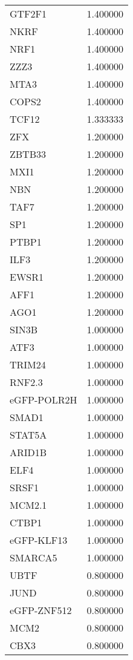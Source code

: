 \begin{longtable}{lr}
          GTF2F1 &  1.400000 \\
            NKRF &  1.400000 \\
            NRF1 &  1.400000 \\
            ZZZ3 &  1.400000 \\
            MTA3 &  1.400000 \\
           COPS2 &  1.400000 \\
           TCF12 &  1.333333 \\
             ZFX &  1.200000 \\
          ZBTB33 &  1.200000 \\
            MXI1 &  1.200000 \\
             NBN &  1.200000 \\
            TAF7 &  1.200000 \\
             SP1 &  1.200000 \\
           PTBP1 &  1.200000 \\
            ILF3 &  1.200000 \\
           EWSR1 &  1.200000 \\
            AFF1 &  1.200000 \\
            AGO1 &  1.200000 \\
           SIN3B &  1.000000 \\
            ATF3 &  1.000000 \\
          TRIM24 &  1.000000 \\
          RNF2.3 &  1.000000 \\
     eGFP-POLR2H &  1.000000 \\
           SMAD1 &  1.000000 \\
          STAT5A &  1.000000 \\
          ARID1B &  1.000000 \\
            ELF4 &  1.000000 \\
           SRSF1 &  1.000000 \\
          MCM2.1 &  1.000000 \\
           CTBP1 &  1.000000 \\
      eGFP-KLF13 &  1.000000 \\
         SMARCA5 &  1.000000 \\
            UBTF &  0.800000 \\
            JUND &  0.800000 \\
     eGFP-ZNF512 &  0.800000 \\
            MCM2 &  0.800000 \\
            CBX3 &  0.800000 \\

\end{longtable}
